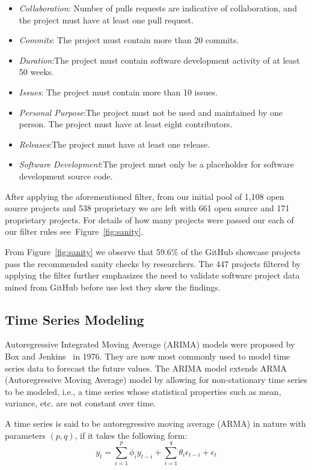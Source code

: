 \documentclass[sigconf, preprint]{acmart}
\newcommand{\fig}[1]{Figure~\ref{fig:#1}}
\begin{document}
\begin{itemize}[leftmargin=*]
\item{\textit{Collaboration}: Number of pulls requests are indicative of 
collaboration, and the project must have at least one pull request.}
\item{\textit{Commits}: The project must contain more than 20 commits.}
\item{\textit{Duration}:The project must contain software development 
activity of at least 50 weeks.}
\item{\textit{Issues}:  The project must contain more than 10 issues.}
\item{\textit{Personal Purpose}:The project must not be used and maintained 
by one person. The project must have at least eight contributors.}
\item{\textit{Releases}:The project must have at least one release.}
\item{\textit{Software Development}:The project must only be a placeholder 
for software development source code.}
\end{itemize}

After applying the aforementioned filter, from our initial pool of 1,108 open source projects and 538 proprietary we are left with 661 open source and 171 
proprietary projects. For details of how many projects were passed our each of our filter rules see~\fig{sanity}.  

From \fig{sanity} we observe that 59.6\% of the GitHub showcase projects pass the 
recommended sanity checks by researchers. The 447 projects filtered by 
applying the filter further emphasizes the need to validate software project 
data mined from GitHub before use lest they skew the findings.


\subsection{Time Series Modeling}
\label{sect:ARIMA}

Autoregressive Integrated Moving Average (ARIMA) models were proposed by Box 
and Jenkins~\cite{box2015time} in 1976. They
are now most commonly used to model time series data to forecast the future 
values. The ARIMA model extends ARMA (Autoregressive Moving Average) model by 
allowing for non-stationary time series to be modeled, i.e., a time series 
whose statistical properties such as mean, variance, etc. are not constant 
over time. 

A time series is said to be autoregressive moving average (ARMA) in nature 
with parameters $(p,q)$, if it takes the following form:
\begin{equation}
\label{eq:arima}
y_t=\sum_{i=1}^{p}\phi_i 
y_{t-i}+\sum_{i=1}^{q}\theta_i\epsilon_{t-i}+\epsilon_t
\end{equation}
\end{document}

